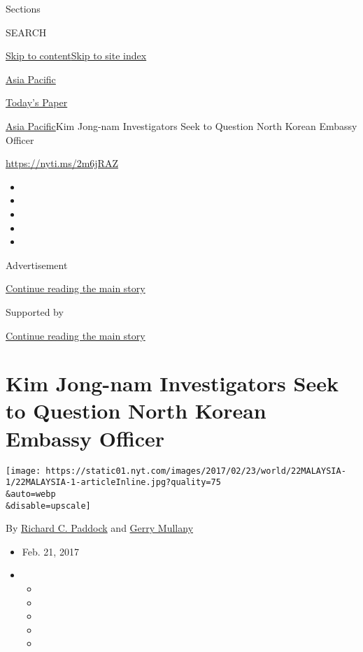Sections

SEARCH

\protect\hyperlink{site-content}{Skip to
content}\protect\hyperlink{site-index}{Skip to site index}

\href{https://www.nytimes.com/section/world/asia}{Asia Pacific}

\href{https://myaccount.nytimes.com/auth/login?response_type=cookie\&client_id=vi}{}

\href{https://www.nytimes.com/section/todayspaper}{Today's Paper}

\href{/section/world/asia}{Asia Pacific}\textbar{}Kim Jong-nam
Investigators Seek to Question North Korean Embassy Officer

\url{https://nyti.ms/2m6jRAZ}

\begin{itemize}
\item
\item
\item
\item
\item
\end{itemize}

Advertisement

\protect\hyperlink{after-top}{Continue reading the main story}

Supported by

\protect\hyperlink{after-sponsor}{Continue reading the main story}

\hypertarget{kim-jong-nam-investigators-seek-to-question-north-korean-embassy-officer}{%
\section{Kim Jong-nam Investigators Seek to Question North Korean
Embassy
Officer}\label{kim-jong-nam-investigators-seek-to-question-north-korean-embassy-officer}}

\texttt{[image: https://static01.nyt.com/images/2017/02/23/world/22MALAYSIA-1/22MALAYSIA-1-articleInline.jpg?quality=75\\\&auto=webp\\\&disable=upscale]}

By \href{https://www.nytimes.com/by/richard-c-paddock}{Richard C.
Paddock} and \href{http://www.nytimes.com/by/gerry-mullany}{Gerry
Mullany}

\begin{itemize}
\item
  Feb. 21, 2017
\item
  \begin{itemize}
  \item
  \item
  \item
  \item
  \item
  \end{itemize}
\end{itemize}

